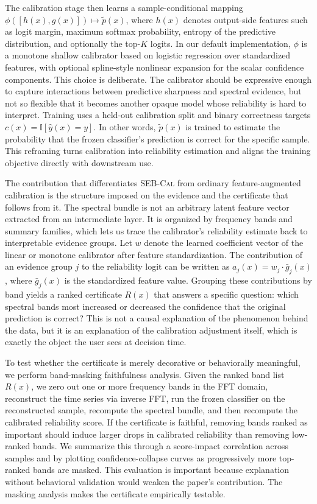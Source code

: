 \documentclass{article}
\newcommand{\method}{\textsc{SEB-Cal}}
\begin{document}
The calibration stage then learns a sample-conditional mapping \(\phi([h(x),g(x)]) \mapsto \tilde{p}(x)\), where \(h(x)\) denotes output-side features such as logit margin, maximum softmax probability, entropy of the predictive distribution, and optionally the top-\(K\) logits. In our default implementation, \(\phi\) is a monotone shallow calibrator based on logistic regression over standardized features, with optional spline-style nonlinear expansion for the scalar confidence components. This choice is deliberate. The calibrator should be expressive enough to capture interactions between predictive sharpness and spectral evidence, but not so flexible that it becomes another opaque model whose reliability is hard to interpret. Training uses a held-out calibration split and binary correctness targets \(c(x)=\mathbb{I}[\hat{y}(x)=y]\). In other words, \(\tilde{p}(x)\) is trained to estimate the probability that the frozen classifier's prediction is correct for the specific sample. This reframing turns calibration into reliability estimation and aligns the training objective directly with downstream use.

The contribution that differentiates \method{} from ordinary feature-augmented calibration is the structure imposed on the evidence and the certificate that follows from it. The spectral bundle is not an arbitrary latent feature vector extracted from an intermediate layer. It is organized by frequency bands and summary families, which lets us trace the calibrator’s reliability estimate back to interpretable evidence groups. Let \(w\) denote the learned coefficient vector of the linear or monotone calibrator after feature standardization. The contribution of an evidence group \(j\) to the reliability logit can be written as \(a_j(x)=w_j \cdot \bar{g}_j(x)\), where \(\bar{g}_j(x)\) is the standardized feature value. Grouping these contributions by band yields a ranked certificate \(R(x)\) that answers a specific question: which spectral bands most increased or decreased the confidence that the original prediction is correct? This is not a causal explanation of the phenomenon behind the data, but it is an explanation of the calibration adjustment itself, which is exactly the object the user sees at decision time.

To test whether the certificate is merely decorative or behaviorally meaningful, we perform band-masking faithfulness analysis. Given the ranked band list \(R(x)\), we zero out one or more frequency bands in the FFT domain, reconstruct the time series via inverse FFT, run the frozen classifier on the reconstructed sample, recompute the spectral bundle, and then recompute the calibrated reliability score. If the certificate is faithful, removing bands ranked as important should induce larger drops in calibrated reliability than removing low-ranked bands. We summarize this through a score-impact correlation across samples and by plotting confidence-collapse curves as progressively more top-ranked bands are masked. This evaluation is important because explanation without behavioral validation would weaken the paper's contribution. The masking analysis makes the certificate empirically testable.
\end{document}
